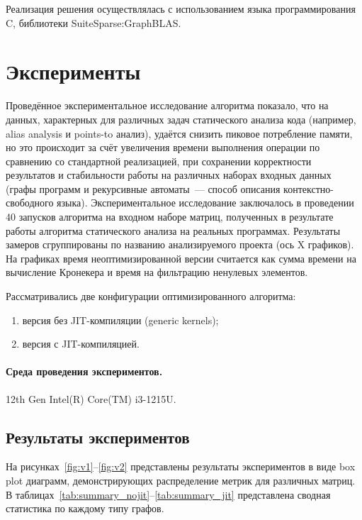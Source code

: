 \documentclass[a4paper]{article}
\begin{document}
Реализация решения осуществлялась с использованием языка программирования C, библиотеки SuiteSparse:GraphBLAS.

\section{Эксперименты}

Проведённое экспериментальное исследование алгоритма показало, что на данных, характерных для различных задач статического анализа кода (например, alias analysis и points-to анализ), удаётся снизить пиковое потребление памяти, но это происходит за счёт увеличения времени выполнения операции по сравнению со стандартной реализацией, при сохранении корректности результатов и стабильности работы на различных наборах входных данных (графы программ и рекурсивные автоматы~--- способ описания контекстно-свободного языка). Экспериментальное исследование заключалось в проведении 40 запусков алгоритма на входном наборе матриц, полученных в результате работы алгоритма статического анализа на реальных программах. Результаты замеров сгруппированы по названию анализируемого проекта (ось X графиков). На графиках время неоптимизированной версии считается как сумма времени на вычисление Кронекера и время на фильтрацию ненулевых элементов. 

Рассматривались две конфигурации оптимизированного алгоритма:
\begin{enumerate}
    \item версия без JIT-компиляции (generic kernels);
    \item версия с JIT-компиляцией.
\end{enumerate}

\paragraph{Среда проведения экспериментов.}

12th Gen Intel(R) Core(TM) i3-1215U.

\subsection{Результаты экспериментов}

На рисунках~\ref{fig:v1}--\ref{fig:v2} представлены результаты экспериментов в виде box plot диаграмм, демонстрирующих распределение метрик для различных матриц. В таблицах~\ref{tab:summary_nojit}--\ref{tab:summary_jit} представлена сводная статистика по каждому типу графов.
\end{document}
